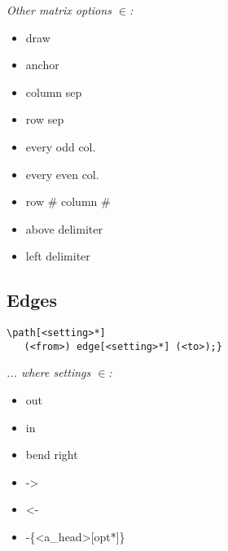 \textit{Other matrix options $\in$:}
{\scriptsize 
\begin{multicols}{3}\begin{itemize}[leftmargin=0mm,label={}]
    \item draw
    \item anchor
    \item column sep
    \item row sep
    \item every odd col.
    \item every even col.
    \item row \# column \#
    \item above delimiter
    \item left delimiter
\end{itemize}\end{multicols}}
\vspace{2mm}



\subsection*{Edges}

\begin{minipage}{6.5cm}\begin{lstlisting}
\path[<setting>*]
   (<from>) edge[<setting>*] (<to>);}
\end{lstlisting}\end{minipage}

\textit{... where settings $\in$: }
{\scriptsize \begin{multicols}{3}\begin{itemize}[label={},leftmargin=0mm]
    \item out
    \item in
    \item bend right
    \item ->
    \item <-
    \item -\{<a\_head>[opt*]\}
\end{itemize}\end{multicols}}
\vspace{1mm}



